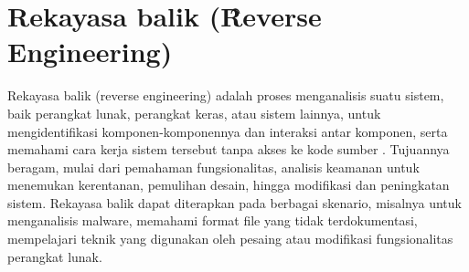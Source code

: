\section{Rekayasa balik (\f{Reverse Engineering})}
Rekayasa balik (reverse engineering) adalah proses menganalisis suatu sistem, baik perangkat lunak, perangkat keras, atau sistem lainnya, untuk mengidentifikasi komponen-komponennya dan interaksi antar komponen, serta memahami cara kerja sistem tersebut tanpa akses ke kode sumber \cite{gee24}.  Tujuannya beragam, mulai dari pemahaman fungsionalitas, analisis keamanan untuk menemukan kerentanan, pemulihan desain, hingga modifikasi dan peningkatan sistem. Rekayasa balik dapat diterapkan pada berbagai skenario, misalnya untuk menganalisis malware, memahami format file yang tidak terdokumentasi, mempelajari teknik yang digunakan oleh pesaing atau modifikasi fungsionalitas perangkat lunak.

